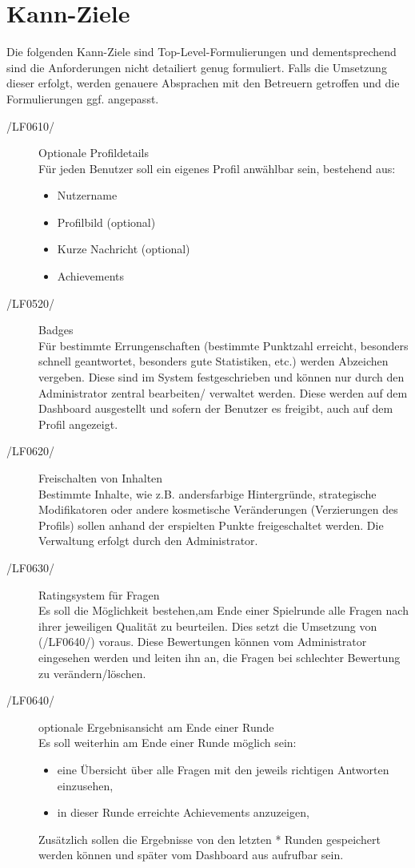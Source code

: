 \documentclass[11pt,a4paper]{scrreprt}
\begin{document}
	
\section{Kann-Ziele}
Die folgenden Kann-Ziele sind Top-Level-Formulierungen und dementsprechend sind die Anforderungen nicht detailiert genug formuliert. Falls die Umsetzung dieser erfolgt, werden genauere Absprachen mit den Betreuern getroffen und die Formulierungen ggf. angepasst.
\begin{description}
\item[/LF0610/] Optionale Profildetails \\ 
Für jeden Benutzer soll ein eigenes Profil anwählbar sein, bestehend aus:
	\begin{itemize}
	\item Nutzername
	\item Profilbild (optional)
	\item Kurze Nachricht (optional)
	\item Achievements
	\end{itemize}

\item[/LF0520/] Badges \\
Für bestimmte Errungenschaften (bestimmte Punktzahl erreicht, besonders schnell geantwortet, besonders gute Statistiken, etc.) werden Abzeichen vergeben. Diese sind im System festgeschrieben und können nur durch den Administrator zentral bearbeiten/ verwaltet werden. Diese werden auf dem Dashboard ausgestellt und sofern der Benutzer es freigibt, auch auf dem Profil angezeigt.
	
\item[/LF0620/] Freischalten von Inhalten \\
Bestimmte Inhalte, wie z.B. andersfarbige Hintergründe, strategische Modifikatoren oder andere kosmetische Veränderungen (Verzierungen des Profils) sollen anhand der erspielten Punkte freigeschaltet werden. Die Verwaltung erfolgt durch den Administrator.

\item[/LF0630/] Ratingsystem für Fragen \\
Es soll die Möglichkeit bestehen,am Ende einer Spielrunde alle Fragen nach ihrer jeweiligen Qualität zu beurteilen. Dies setzt die Umsetzung von (/LF0640/) voraus. Diese Bewertungen können vom Administrator eingesehen werden und leiten ihn an, die Fragen bei schlechter Bewertung zu verändern/löschen.

\item[/LF0640/] optionale Ergebnisansicht am Ende einer Runde \\
Es soll weiterhin am Ende einer Runde möglich sein:
		\begin{itemize}
		\item eine Übersicht über alle Fragen mit den jeweils richtigen Antworten einzusehen,
		\item in dieser Runde erreichte Achievements anzuzeigen,
		\end{itemize}
Zusätzlich sollen die Ergebnisse von den letzten * Runden gespeichert werden können und später vom Dashboard aus aufrufbar sein.


\end{description}
\end{document}
